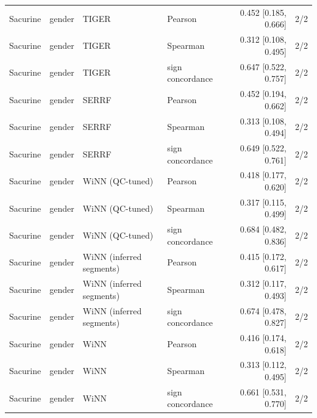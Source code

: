 \begin{landscape}
\begin{longtable}{llllrr}
Sacurine & gender & TIGER & Pearson & 0.452 [0.185, 0.666] & 2/2 \\
Sacurine & gender & TIGER & Spearman & 0.312 [0.108, 0.495] & 2/2 \\
Sacurine & gender & TIGER & sign concordance & 0.647 [0.522, 0.757] & 2/2 \\
Sacurine & gender & SERRF & Pearson & 0.452 [0.194, 0.662] & 2/2 \\
Sacurine & gender & SERRF & Spearman & 0.313 [0.108, 0.494] & 2/2 \\
Sacurine & gender & SERRF & sign concordance & 0.649 [0.522, 0.761] & 2/2 \\
Sacurine & gender & WiNN (QC-tuned) & Pearson & 0.418 [0.177, 0.620] & 2/2 \\
Sacurine & gender & WiNN (QC-tuned) & Spearman & 0.317 [0.115, 0.499] & 2/2 \\
Sacurine & gender & WiNN (QC-tuned) & sign concordance & 0.684 [0.482, 0.836] & 2/2 \\
Sacurine & gender & WiNN (inferred segments) & Pearson & 0.415 [0.172, 0.617] & 2/2 \\
Sacurine & gender & WiNN (inferred segments) & Spearman & 0.312 [0.117, 0.493] & 2/2 \\
Sacurine & gender & WiNN (inferred segments) & sign concordance & 0.674 [0.478, 0.827] & 2/2 \\
Sacurine & gender & WiNN & Pearson & 0.416 [0.174, 0.618] & 2/2 \\
Sacurine & gender & WiNN & Spearman & 0.313 [0.112, 0.495] & 2/2 \\
Sacurine & gender & WiNN & sign concordance & 0.661 [0.531, 0.770] & 2/2 \\
\end{longtable}
\endgroup
\end{landscape}
